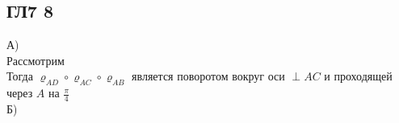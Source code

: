 \subsection*{ГЛ7 8}
А)\\
Рассмотрим \\
Тогда $\varrho_{A D} \circ \varrho_{A C} \circ \varrho_{A B}$ является поворотом вокруг оси $\perp AC$ и проходящей через $A$ на $\frac{\pi}{4}$
\\
Б)\\
\\
		